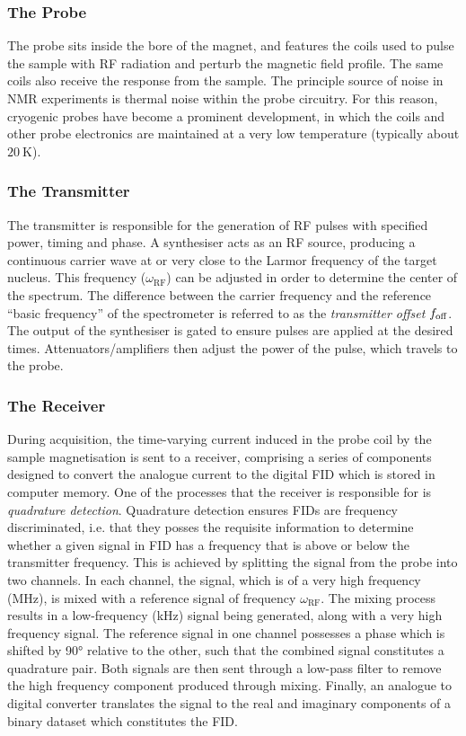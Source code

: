 \subsubsection{The Probe}
The probe sits inside the bore of the magnet, and features the coils used to
pulse the sample with \ac{RF} radiation and perturb the magnetic field profile.
The same coils also receive the response from the sample. The principle source
of noise in \ac{NMR} experiments is thermal noise within the probe circuitry.
For this reason, cryogenic probes have become a prominent
development, in which the coils and other probe electronics are maintained at a
very low temperature (typically about $\qty{20}{\kelvin}$)\cite{Kovacs2020}.

\subsubsection{The Transmitter}
The transmitter is responsible for the generation of \ac{RF} pulses
with specified power, timing and phase.
A synthesiser acts as an \ac{RF} source, producing a continuous carrier wave at
or very close to the Larmor frequency of the target nucleus. This frequency
($\omega_{\text{RF}}$) can be adjusted in order to determine the center of the
spectrum. The difference between the carrier frequency and the reference
``basic frequency'' of the spectrometer is referred to as the \emph{transmitter
offset} $f_{\text{off}}$.  The output of the synthesiser is gated to ensure pulses are
applied at the desired times. Attenuators/amplifiers then adjust the power
of the pulse, which travels to the probe.

\subsubsection{The Receiver}
During acquisition, the time-varying current induced in the probe coil by
the sample magnetisation is
sent to a receiver, comprising a series of components designed to convert the
analogue current to the digital \ac{FID} which is stored in computer memory.
One of the processes that the receiver is responsible for is \emph{quadrature
detection}\cite[Section 13.6]{Keeler2010}. Quadrature detection ensures
\acp{FID} are frequency discriminated, i.e. that they posses the requisite
information to determine whether a given signal in \ac{FID} has a frequency
that is above or below the transmitter frequency.
This is achieved by splitting the signal from the probe into two channels. In
each channel, the signal, which is of a very high frequency
(\unit{\mega\hertz}), is mixed with a reference signal of frequency
$\omega_{\text{RF}}$. The mixing process results in a low-frequency
(\unit{\kilo\hertz}) signal being generated, along with a very high frequency
signal. The reference signal in one channel possesses a phase which
is shifted by \ang{90} relative to the other, such that the combined signal
constitutes a quadrature pair.
Both signals are then sent through a low-pass filter to remove
the high frequency component produced through mixing. Finally, an analogue to
digital converter translates the signal to the real and imaginary components of
a binary dataset which constitutes the \ac{FID}.

